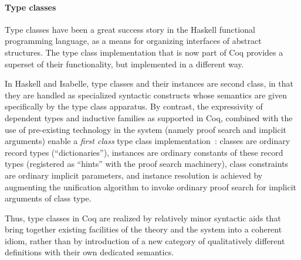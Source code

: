 \documentclass[a4paper,10pt,runningheads]{llncs}
\begin{document}
\paragraph{Type classes}

Type classes have been a great success story in the Haskell functional programming language, as a means for organizing interfaces of abstract structures. The type class implementation that is now part of Coq provides a superset of their functionality, but implemented in a different way.

In Haskell and Isabelle, type classes and their instances are second class, in that they are handled as specialized syntactic constructs whose semantics are given specifically by the type class apparatus. By contrast, the expressivity of dependent types and inductive families as supported in Coq, combined with the use of pre-existing technology in the system (namely proof search and implicit arguments) enable a \emph{first class} type class implementation~\cite{DBLP:conf/tphol/SozeauO08}: classes are ordinary record types (``dictionaries''), instances are ordinary constants of these record types (registered as ``hints'' with the proof search machinery), class constraints are ordinary implicit parameters, and instance resolution is achieved by augmenting the unification algorithm to invoke ordinary proof search for implicit arguments of class type.

Thus, type classes in Coq are realized by relatively minor syntactic aids that bring together existing facilities of the theory and the system into a coherent idiom, rather than by introduction of a new category of qualitatively different definitions with their own dedicated semantics.


\end{document}
